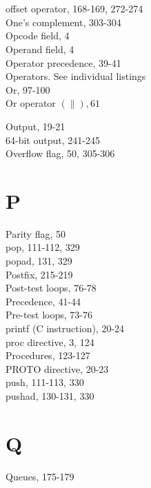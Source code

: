 \documentclass[10pt]{book}
\begin{document}
\section{}
offset operator, 168-169, 272-274\\
One's complement, 303-304\\
Opcode field, 4\\
Operand field, 4\\
Operator precedence, 39-41\\
Operators. See individual listings\\
Or, 97-100\\
Or operator $(\|), 61$

Output, 19-21\\
64-bit output, 241-245\\
Overflow flag, 50, 305-306

\section{P}
Parity flag, 50\\
pop, 111-112, 329\\
popad, 131, 329\\
Postfix, 215-219\\
Post-test loops, 76-78\\
Precedence, 41-44\\
Pre-test loops, 73-76\\
printf (C instruction), 20-24\\
proc directive, 3, 124\\
Procedures, 123-127\\
PROTO directive, 20-23\\
push, 111-113, 330\\
pushad, 130-131, 330

\section{Q}
Queues, 175-179
\end{document}
